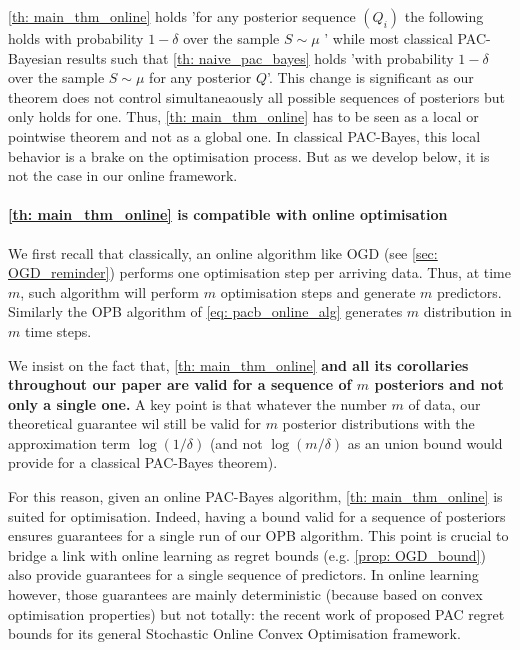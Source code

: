 \begin{noaddcontents}
\cref{th: main_thm_online} holds 'for any posterior sequence $(Q_i)$ the following holds with probability $1-\delta$ over the sample $S\sim\mu$ ' while most classical PAC-Bayesian results such that \cref{th: naive_pac_bayes} holds 'with probability $1-\delta$ over the sample $S\sim\mu$ for any posterior $Q$'. This change is significant as our theorem does not control simultaneaously all possible sequences of posteriors but only holds for one.
Thus, \cref{th: main_thm_online} has to be seen as a local or pointwise theorem and not as a global one. In classical PAC-Bayes, this local behavior is a brake on the optimisation process. But as we develop below, it is not the case in our online framework.

\paragraph{\cref{th: main_thm_online} is compatible with online optimisation}

We first recall that classically, an online algorithm like OGD (see \cref{sec: OGD_reminder}) performs one optimisation step per arriving data. Thus, at time $m$, such algorithm will perform $m$ optimisation steps and generate $m$ predictors. Similarly the OPB algorithm of \cref{eq: pacb_online_alg} generates $m$ distribution in $m$ time steps.

We insist on the fact that, \cref{th: main_thm_online} \textbf{and all its corollaries throughout our paper are valid for a sequence of $m$ posteriors and not only a single one.} A key point is that whatever the number $m$ of data, our theoretical guarantee wil still be valid for $m$ posterior distributions with the approximation term $\log(1/\delta)$ (and not $\log(m/\delta)$ as an union bound would provide for a classical PAC-Bayes theorem).

For this reason, given an online PAC-Bayes algorithm, \cref{th: main_thm_online} is suited for optimisation. Indeed, having a bound valid for a sequence of posteriors ensures guarantees for a single run of our OPB algorithm. This point is crucial to bridge a link with online learning as regret bounds (e.g. \cref{prop: OGD_bound}) also provide guarantees for a single sequence of predictors. In online learning however, those guarantees are mainly deterministic (because based on convex optimisation properties) but not totally: the recent work of \cite{wintenberger2021stochastic} proposed PAC regret bounds for its general Stochastic Online Convex Optimisation framework.


\end{noaddcontents}
